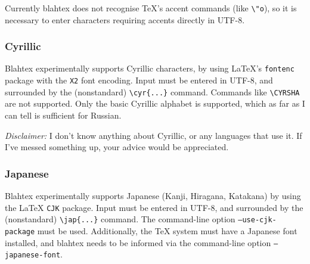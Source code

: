 \documentclass{article}
\newcommand{\texcommand}[1]{\textbackslash{}#1}
\begin{document}
{\begin{quote}
\end{quote}
}

\begin{latexonly}
\nonasciicharlist
\end{latexonly}

\begin{htmlonly}
\newcommand{\unichar}[1]{\rawhtml&\##1;\endrawhtml}
\nonasciicharlist
\end{htmlonly}

Currently blahtex does not recognise \TeX{}'s accent commands (like \texttt{\textbackslash"o}), so it is necessary to enter characters requiring accents directly in UTF-8.

\subsubsection{Cyrillic}

Blahtex experimentally supports Cyrillic characters, by using \LaTeX's \texttt{fontenc} package with the \texttt{X2} font encoding. Input must be entered in UTF-8, and surrounded by the (nonstandard) \texttt{\texcommand{cyr}\{...\}} command. Commands like \texttt{\texcommand{CYRSHA}} are not supported. Only the basic Cyrillic alphabet is supported, which as far as I can tell is sufficient for Russian.

\textit{Disclaimer:} I don't know anything about Cyrillic, or any languages that use it. If I've messed something up, your advice would be appreciated.

\subsubsection{Japanese}

Blahtex experimentally supports Japanese (Kanji, Hiragana, Katakana) by using the \LaTeX{} \texttt{CJK} package. Input must be entered in UTF-8, and surrounded by the (nonstandard) \texttt{\texcommand{jap}\{...\}} command. The command-line option \texttt{--use-cjk-package} must be used. Additionally, the \TeX{} system must have a Japanese font installed, and blahtex needs to be informed via the command-line option \texttt{--japanese-font}.
\end{document}
